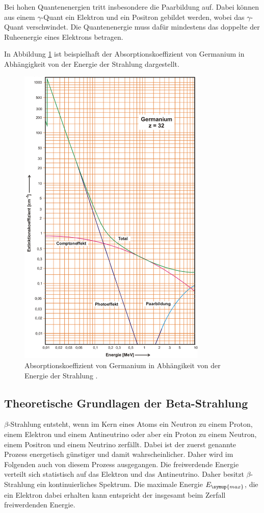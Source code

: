 Bei hohen Quantenenergien tritt insbesondere die Paarbildung auf. Dabei können aus
einem $\gamma$-Quant ein Elektron und ein Positron gebildet werden, wobei das
$\gamma$-Quant verschwindet. Die Quantenenergie muss dafür mindestens das doppelte
der Ruheenergie eines Elektrons betragen.

In Abbildung \ref{fig:gamma} ist beispielhaft der Absorptionskoeffizient von Germanium in
Abhängigkeit von der Energie der Strahlung dargestellt.


\begin{figure}
  \centering
  \includegraphics[width=9cm]{data/germanium.png}
  \caption{Absorptionskoeffizient von Germanium in Abhängikeit von der Energie
  der Strahlung \cite{Versuchsanleitung}.}
  \label{fig:gamma}
\end{figure}


\subsection{Theoretische Grundlagen der Beta-Strahlung} %
\label{subsec:beta}

$\beta$-Strahlung entsteht, wenn im Kern eines Atoms ein Neutron zu einem Proton, einem
Elektron und einem Antineutrino oder aber ein Proton zu einem Neutron, einem Positron
und einem Neutrino zerfällt. Dabei ist der zuerst genannte Prozess energetisch günstiger
und damit wahrscheinlicher. Daher wird im Folgenden auch von diesem Prozess ausgegangen.
Die freiwerdende Energie verteilt sich statistisch auf das Elektron und das Antineutrino.
Daher besitzt $\beta$-Strahlung
ein kontinuierliches Spektrum. Die maximale Energie $E_{\symup{max}}$, die ein
Elektron dabei erhalten kann entspricht der insgesamt beim Zerfall freiwerdenden Energie.

